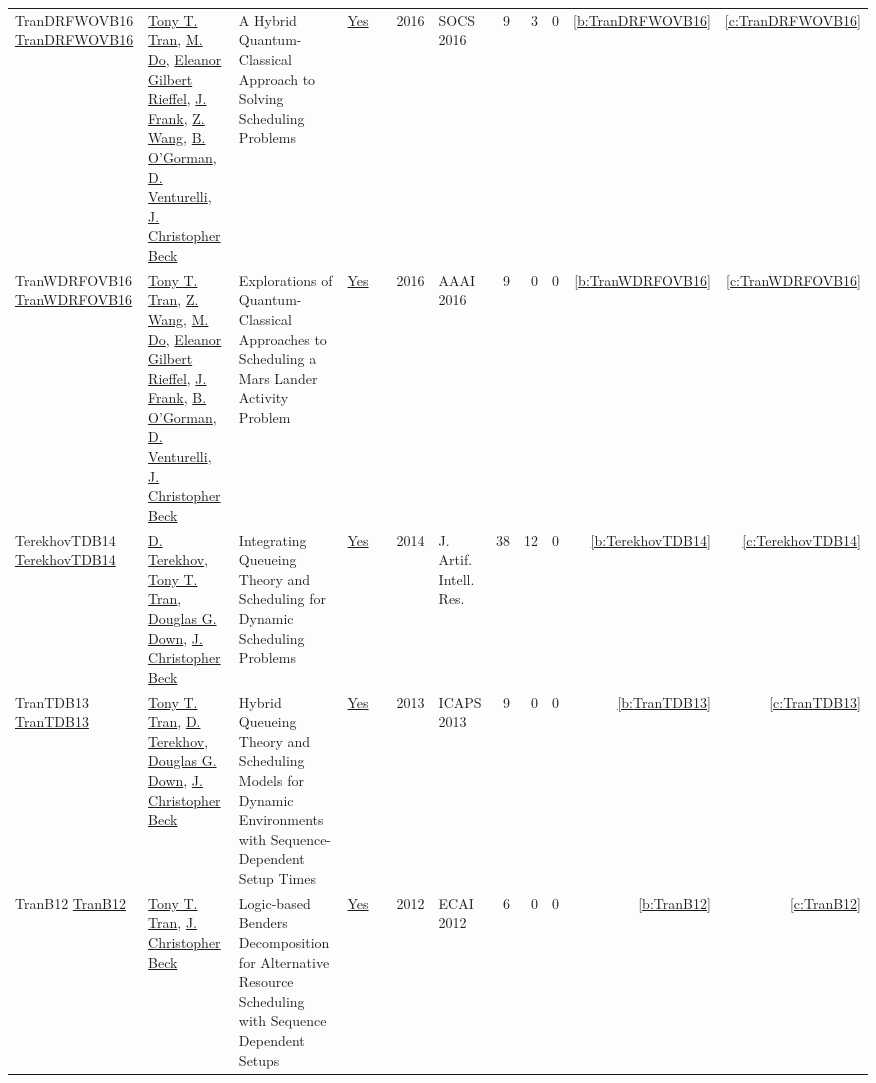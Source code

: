 {\begin{longtable}{>{\raggedright\arraybackslash}p{3cm}>{\raggedright\arraybackslash}p{6cm}>{\raggedright\arraybackslash}p{6.5cm}rrrp{2.5cm}rrrrr}
TranDRFWOVB16 \href{https://doi.org/10.1609/socs.v7i1.18390}{TranDRFWOVB16} & \hyperref[auth:a811]{Tony T. Tran}, \hyperref[auth:a821]{M. Do}, \hyperref[auth:a822]{Eleanor Gilbert Rieffel}, \hyperref[auth:a385]{J. Frank}, \hyperref[auth:a820]{Z. Wang}, \hyperref[auth:a823]{B. O'Gorman}, \hyperref[auth:a824]{D. Venturelli}, \hyperref[auth:a89]{J. Christopher Beck} & A Hybrid Quantum-Classical Approach to Solving Scheduling Problems & \href{../works/TranDRFWOVB16.pdf}{Yes} & \cite{TranDRFWOVB16} & 2016 & SOCS 2016 & 9 & 3 & 0 & \ref{b:TranDRFWOVB16} & \ref{c:TranDRFWOVB16}\\
TranWDRFOVB16 \href{http://www.aaai.org/ocs/index.php/WS/AAAIW16/paper/view/12664}{TranWDRFOVB16} & \hyperref[auth:a811]{Tony T. Tran}, \hyperref[auth:a820]{Z. Wang}, \hyperref[auth:a821]{M. Do}, \hyperref[auth:a822]{Eleanor Gilbert Rieffel}, \hyperref[auth:a385]{J. Frank}, \hyperref[auth:a823]{B. O'Gorman}, \hyperref[auth:a824]{D. Venturelli}, \hyperref[auth:a89]{J. Christopher Beck} & Explorations of Quantum-Classical Approaches to Scheduling a Mars Lander Activity Problem & \href{../works/TranWDRFOVB16.pdf}{Yes} & \cite{TranWDRFOVB16} & 2016 & AAAI 2016 & 9 & 0 & 0 & \ref{b:TranWDRFOVB16} & \ref{c:TranWDRFOVB16}\\
TerekhovTDB14 \href{https://doi.org/10.1613/jair.4278}{TerekhovTDB14} & \hyperref[auth:a830]{D. Terekhov}, \hyperref[auth:a811]{Tony T. Tran}, \hyperref[auth:a815]{Douglas G. Down}, \hyperref[auth:a89]{J. Christopher Beck} & Integrating Queueing Theory and Scheduling for Dynamic Scheduling Problems & \href{../works/TerekhovTDB14.pdf}{Yes} & \cite{TerekhovTDB14} & 2014 & J. Artif. Intell. Res. & 38 & 12 & 0 & \ref{b:TerekhovTDB14} & \ref{c:TerekhovTDB14}\\
TranTDB13 \href{http://www.aaai.org/ocs/index.php/ICAPS/ICAPS13/paper/view/6005}{TranTDB13} & \hyperref[auth:a811]{Tony T. Tran}, \hyperref[auth:a830]{D. Terekhov}, \hyperref[auth:a815]{Douglas G. Down}, \hyperref[auth:a89]{J. Christopher Beck} & Hybrid Queueing Theory and Scheduling Models for Dynamic Environments with Sequence-Dependent Setup Times & \href{../works/TranTDB13.pdf}{Yes} & \cite{TranTDB13} & 2013 & ICAPS 2013 & 9 & 0 & 0 & \ref{b:TranTDB13} & \ref{c:TranTDB13}\\
TranB12 \href{https://doi.org/10.3233/978-1-61499-098-7-774}{TranB12} & \hyperref[auth:a811]{Tony T. Tran}, \hyperref[auth:a89]{J. Christopher Beck} & Logic-based Benders Decomposition for Alternative Resource Scheduling with Sequence Dependent Setups & \href{../works/TranB12.pdf}{Yes} & \cite{TranB12} & 2012 & ECAI 2012 & 6 & 0 & 0 & \ref{b:TranB12} & \ref{c:TranB12}\\
\end{longtable}
}

